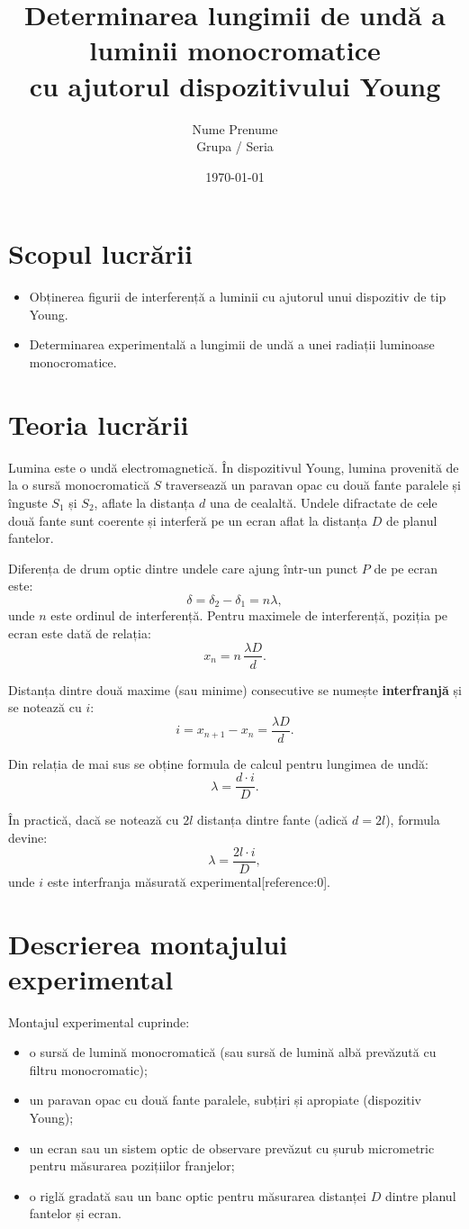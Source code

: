 \documentclass[12pt,a4paper]{article}
\title{\textbf{Determinarea lungimii de undă a luminii monocromatice\\ cu ajutorul dispozitivului Young}}
\author{Nume Prenume \\ Grupa / Seria}
\date{\today}
\begin{document}
\maketitle

\section{Scopul lucrării}
\begin{itemize}
    \item Obținerea figurii de interferență a luminii cu ajutorul unui dispozitiv de tip Young.
    \item Determinarea experimentală a lungimii de undă a unei radiații luminoase monocromatice.
\end{itemize}

\section{Teoria lucrării}
Lumina este o undă electromagnetică. În dispozitivul Young, lumina provenită de la o sursă monocromatică \(S\) traversează un paravan opac cu două fante paralele și înguste \(S_1\) și \(S_2\), aflate la distanța \(d\) una de cealaltă. Undele difractate de cele două fante sunt coerente și interferă pe un ecran aflat la distanța \(D\) de planul fantelor.

Diferența de drum optic dintre undele care ajung într-un punct \(P\) de pe ecran este:
\[
\delta = \delta_2 - \delta_1 = n\lambda,
\]
unde \(n\) este ordinul de interferență. Pentru maximele de interferență, poziția pe ecran este dată de relația:
\[
x_n = n\,\frac{\lambda D}{d}.
\]

Distanța dintre două maxime (sau minime) consecutive se numește \textbf{interfranjă} și se notează cu \(i\):
\[
i = x_{n+1} - x_n = \frac{\lambda D}{d}.
\]

Din relația de mai sus se obține formula de calcul pentru lungimea de undă:
\[
\lambda = \frac{d \cdot i}{D}.
\]

În practică, dacă se notează cu \(2l\) distanța dintre fante (adică \(d = 2l\)), formula devine:
\[
\lambda = \frac{2l \cdot i}{D},
\]
unde \(i\) este interfranja măsurată experimental[reference:0].

\section{Descrierea montajului experimental}
Montajul experimental cuprinde:
\begin{itemize}
    \item o sursă de lumină monocromatică (sau sursă de lumină albă prevăzută cu filtru monocromatic);
    \item un paravan opac cu două fante paralele, subțiri și apropiate (dispozitiv Young);
    \item un ecran sau un sistem optic de observare prevăzut cu șurub micrometric pentru măsurarea pozițiilor franjelor;
    \item o riglă gradată sau un banc optic pentru măsurarea distanței \(D\) dintre planul fantelor și ecran.
\end{itemize}
\end{document}
